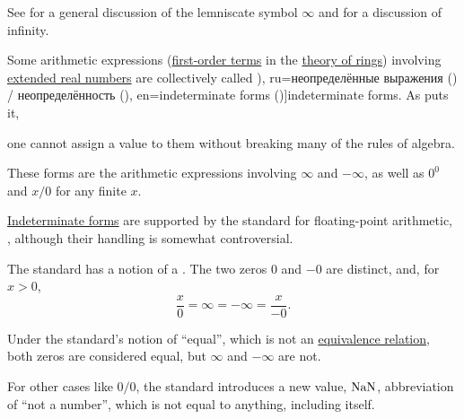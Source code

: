 \begin{comments}
  \item See  for a general discussion of the lemniscate symbol \( \infty \) and  for a discussion of infinity.
\end{comments}

\begin{definition}\label{def:indeterminate_form}\mimprovised
  Some arithmetic expressions (\hyperref[def:first_order_syntax/term]{first-order terms} in the \hyperref[def:ring/theory]{theory of rings}) involving \hyperref[def:extended_real_numbers]{extended real numbers} are collectively called \term[bg=неопределености (\cite[228]{ИлинСадовничиСендов1984АнализТом1}), ru=неопределённые выражения (\cite[\S 41]{Фихтенгольц1968ОсновыАнализаТом1}) / неопределённость (\cite[235]{ИльинСадовничийСендов1985АнализТом1}), en=indeterminate forms (\cite[12]{Tao2011MeasureTheory})]{indeterminate forms}. As  puts it,
  \begin{displayquote}
    \textellipsis one cannot assign a value to them without breaking many of the rules of algebra.
  \end{displayquote}

  These forms are the arithmetic expressions involving \( \infty \) and \( -\infty \), as well as \( 0^0 \) and \( x / 0 \) for any finite \( x \).
\end{definition}

\begin{remark}\label{rem:floating_point_indeterminate_forms}
  \hyperref[def:indeterminate_form]{Indeterminate forms} are supported by the standard for floating-point arithmetic, \cite[31]{IEEE:754:2019}, although their handling is somewhat controversial.

  The standard has a notion of a . The two zeros \( 0 \) and \( -0 \) are distinct, and, for \( x > 0 \),
  \begin{equation*}
    \frac x 0 = \infty = -\infty = \frac x {-0}.
  \end{equation*}

  Under the standard's notion of \enquote{equal}, which is not an \hyperref[def:equivalence_relation]{equivalence relation}, both zeros are considered equal, but \( \infty \) and \( -\infty \) are not.

  For other cases like \( 0 / 0 \), the standard introduces a new value, \( \op{NaN} \), abbreviation of \enquote{not a number}, which is not equal to anything, including itself.
\end{remark}


